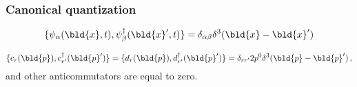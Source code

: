 \begin{comment}
Writing a quantized free Dirac field
corresponding to Eq. (\ref{eqn:DiracFieldClExpand}) as
\begin{equation}
\psi(x) 
=
\int \frac{d^3 \bld{p}}{\sqrt{(2\pi)^3} 2 p^0}
\sum_{s = \pm 1}
\left[
c(\bld{p}, s) u(\bld{p}, s) e^{-ipx}
+
d^\dagger(\bld{p}, s) v(\bld{p}, s) e^{ipx}
\right]
\end{equation}
creation and annihilation operators satisfy
\footnote{ %
\begin{eqnarray}
\{ \psi_\xi(t, \bld{x}), \psi_\eta^\dagger(t, \bld{y}) \}_+
&=&
\int \frac{d^3 \bld{p} d^3 \bld{p}'}{(2\pi)^3 4 E E'}
\sum_{\alpha, \beta} \left(
\{ c_\alpha(\bld{p}), c^\dagger_\beta(\bld{p}') \}
u^{(\alpha)}_\xi (\bld{p}) u^{(\beta) \dagger}_\eta (\bld{p}')
\right.
\nonumber\\
&&
\left.
+
\{ d^\dagger_\alpha(\bld{p}), d_\beta(\bld{p}') \}
v^{(\alpha)}_\xi (\bld{p}) v^{(\beta) \dagger}_\eta (\bld{p}')
\right)
\nonumber\\
&=& \dots
\nonumber\\
&=& 
\delta_{\xi \eta} \delta^3(\bld{x} - \bld{y})
\end{eqnarray}
}%


\end{comment}

\subsubsection{Canonical quantization}

\begin{eqnarray}
\{ \psi_\alpha(\bld{x},t), \psi_\beta^\dagger(\bld{x}', t) \}
= \delta_{\alpha \beta} \delta^3(\bld{x} - \bld{x}')
\label{eqn:canonicalQ_psi}
\end{eqnarray}


\begin{equation}
\{ c_{r}(\bld{p}), c_{r'}^\dagger(\bld{p}') \}
=
\{ d_{r}(\bld{p}), d_{r'}^\dagger(\bld{p}') \}
=
\delta_{rr'} 2p^0 
\delta^3(\bld{p} - \bld{p}')\,,
\label{eqn:Dirc_creann}
\end{equation}
and other anticommutators are equal to zero.

